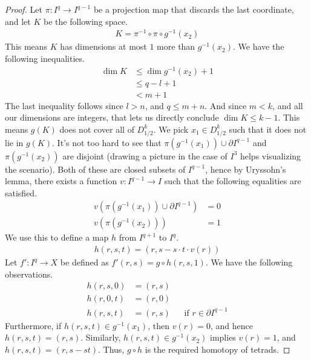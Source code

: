 \documentclass[12pt, notitlepage]{article}
\theoremstyle{definition}
\begin{document}
\begin{proof}
    Let $\pi: I^q \to I^{q-1}$ be a projection map that discards the last coordinate, and let $K$ be
    the following space.
    \begin{align*}
      K = \pi^{-1} \circ \pi \circ g^{-1} (x_2)
    \end{align*}
    This means $K$ has dimensions at most $1$ more than $g^{-1}(x_2)$. We have the following
    inequalities.
    \begin{align*}
      \dim K &\leq \dim g^{-1}(x_2) + 1 \\
             &\leq q - l + 1 \\
             &< m + 1
    \end{align*}
    The last inequality follows since $l > n$, and $q \leq m+n$. And since $m < k$, and all our
    dimensions are integers, that lets us directly conclude $\dim K \leq k - 1$. This means $g(K)$
    does not cover all of $D^k_{1/2}$. We pick $x_1 \in D^k_{1/2}$ such that it does not lie in
    $g(K)$. It's not too hard to see that $\pi(g^{-1}(x_1)) \cup \partial I^{q-1}$ and
    $\pi(g^{-1}(x_2))$ are disjoint (drawing a picture in the case of $I^3$ helps visualizing the
    scenario). Both of these are closed subsets of
    $I^{q-1}$, hence by Uryssohn's lemma, there exists a function $v: I^{q-1} \to I$ such that the
    following equalities are satisfied.
    \begin{align*}
      v(\pi(g^{-1}(x_1)) \cup \partial I^{q-1}) &= 0 \\
      v(\pi(g^{-1}(x_2))) &= 1
    \end{align*}
    We use this to define a map $h$ from $I^{q+1}$ to $I^q$.
    \begin{align*}
      h(r, s, t) = (r, s - s \cdot t \cdot v(r))
    \end{align*}
    Let $f': I^q \to X$ be defined as $f'(r,s) = g \circ h(r,s, 1)$.  We have the following
    observations.
    \begin{align*}
      h(r,s,0) &= (r,s) \\
      h(r,0,t) &= (r, 0) \\
      h(r,s,t) &= (r,s) &&\text{if $r \in \partial I^{q-1}$}
    \end{align*}
    Furthermore, if $h(r,s,t) \in g^{-1}(x_1)$, then $v(r) = 0$, and hence $h(r,s,t) = (r,s)$.
    Similarly, $h(r,s,t) \in g^{-1}(x_2)$ implies $v(r)= 1$, and $h(r,s,t) = (r, s-st)$. Thus,
    $g \circ h$ is the required homotopy of tetrads.
    
  \end{proof}
  
\end{document}
